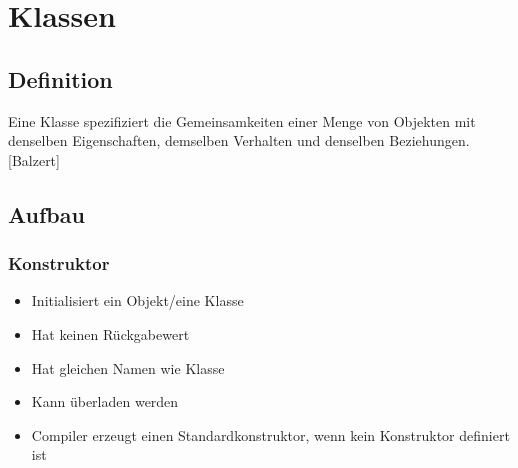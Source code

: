 \section{Klassen}
\subsection{Definition}
Eine Klasse spezifiziert die Gemeinsamkeiten einer Menge von Objekten mit denselben Eigenschaften, 
demselben Verhalten und denselben Beziehungen. [Balzert]

\begin{minipage}[t]{0.5\columnwidth}
    \subsection{Aufbau}
    
\end{minipage}\hfill%
\begin{minipage}[t]{0.49\columnwidth}
    \subsubsection{Konstruktor}
    \raggedright%
    \begin{itemize}
        \item Initialisiert ein Objekt/eine Klasse
        \item Hat keinen Rückgabewert
        \item Hat gleichen Namen wie Klasse
        \item Kann überladen werden
        \item Compiler erzeugt einen Standardkonstruktor, wenn kein Konstruktor definiert ist
    \end{itemize}
\end{minipage}

